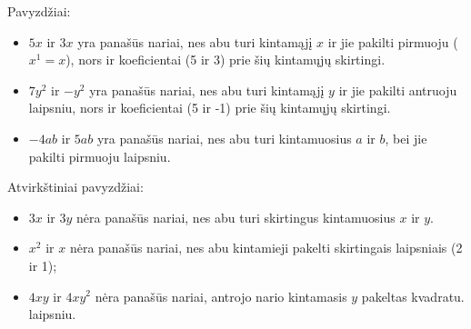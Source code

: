 \documentclass[a4paper]{article}
\begin{document}
\begin{enumerate}
            Pavyzdžiai:
            \begin{itemize}
                  \item $5x$ ir $3x$ yra panašūs nariai, nes abu turi kintamąjį
                        $x$
                        ir jie pakilti pirmuoju ($x^{1}=x$), nors ir
                        koeficientai
                        (5 ir 3) prie šių
                        kintamųjų skirtingi.
                  \item $7y^{2}$ ir $-y^2$ yra panašūs nariai, nes abu turi
                        kintamąjį $y$ ir jie pakilti antruoju laipsniu, nors ir
                        koeficientai (5 ir
                        -1) prie šių kintamųjų skirtingi.
                  \item $-4ab$ ir $5ab$ yra panašūs nariai, nes abu turi
                        kintamuosius $a$ ir $b$, bei jie pakilti pirmuoju
                        laipsniu.
            \end{itemize}

            Atvirkštiniai pavyzdžiai:
            \begin{itemize}
                  \item $3x$ ir $3y$ nėra panašūs nariai, nes abu turi
                        skirtingus kintamuosius
                        $x$ ir $y$.
                  \item $x^{2}$ ir $x$ nėra panašūs nariai, nes abu kintamieji pakelti skirtingais laipsniais (2 ir 1);
                  \item $4xy$ ir $4xy^{2}$ nėra panašūs nariai, antrojo nario kintamasis $y$ pakeltas kvadratu.
                        laipsniu.
            \end{itemize}
\end{enumerate}



\end{document}
